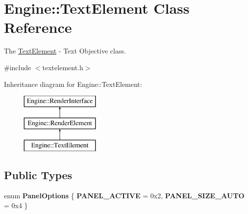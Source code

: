 \hypertarget{classEngine_1_1TextElement}{}\section{Engine\+:\+:Text\+Element Class Reference}
\label{classEngine_1_1TextElement}


The \hyperlink{classEngine_1_1TextElement}{Text\+Element} -\/ Text Objective class.  




{\ttfamily \#include $<$textelement.\+h$>$}

Inheritance diagram for Engine\+:\+:Text\+Element\+:\begin{figure}[H]
\begin{center}
\leavevmode
\includegraphics[height=3.000000cm]{classEngine_1_1TextElement}
\end{center}
\end{figure}
\subsection*{Public Types}
\begin{DoxyCompactItemize}
\item 
\hypertarget{classEngine_1_1TextElement_a307538b783641dfcf548c05ce81a4fb4}{}enum {\bfseries Panel\+Options} \{ {\bfseries P\+A\+N\+E\+L\+\_\+\+A\+C\+T\+I\+V\+E} = 0x2, 
{\bfseries P\+A\+N\+E\+L\+\_\+\+S\+I\+Z\+E\+\_\+\+A\+U\+T\+O} = 0x4
 \}\label{classEngine_1_1TextElement_a307538b783641dfcf548c05ce81a4fb4}

\end{DoxyCompactItemize}
